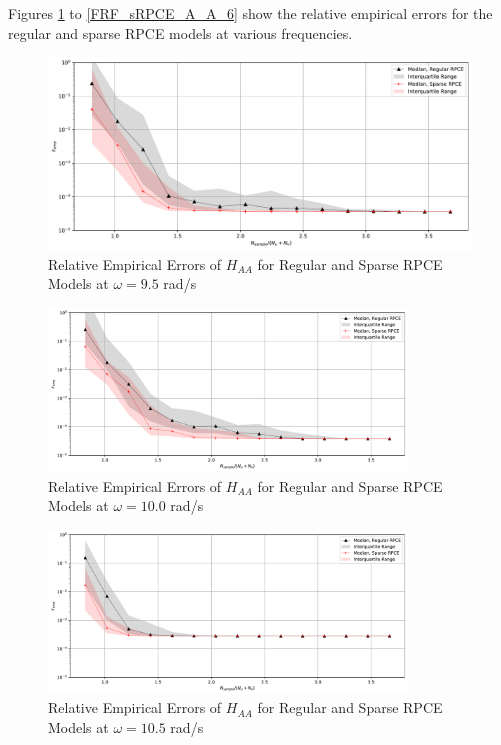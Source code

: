 Figures \ref{FRF_sRPCE_A_A_3} to \ref{FRF_sRPCE_A_A_6} show the relative empirical errors for the regular and sparse RPCE models at various frequencies.
\begin{figure}[H]
    \centering
    \includegraphics[width=1.0\textwidth]{
        plots/surrogate/plot_1_A_3.pdf
    }
    \caption{%
        Relative Empirical Errors of $H_{AA}$ for Regular and Sparse RPCE Models at $\omega=9.5$ rad/s
    }
    \label{FRF_sRPCE_A_A_3}
\end{figure}
\begin{figure}[H]
    \centering
    \includegraphics[width=0.85\textwidth]{
        plots/surrogate/plot_1_A_4.pdf
    }
    \caption{%
        Relative Empirical Errors of $H_{AA}$ for Regular and Sparse RPCE Models at $\omega=10.0$ rad/s
    }
    \label{FRF_sRPCE_A_A_4}
\end{figure}
\begin{figure}[H]
    \centering
    \includegraphics[width=0.85\textwidth]{
        plots/surrogate/plot_1_A_5.pdf
    }
    \caption{%
        Relative Empirical Errors of $H_{AA}$ for Regular and Sparse RPCE Models at $\omega=10.5$ rad/s
    }
    \label{FRF_sRPCE_A_A_5}
\end{figure}

